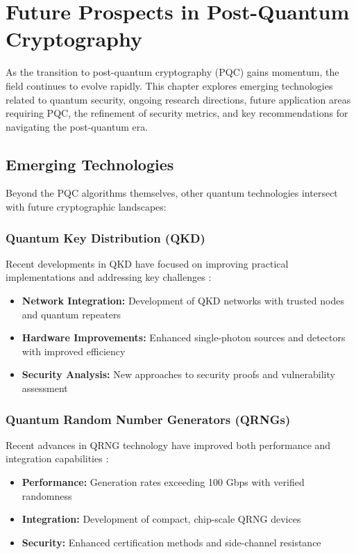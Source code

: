 \chapter{Future Prospects in Post-Quantum Cryptography}\label{chap:future_prospects}

As the transition to post-quantum cryptography (PQC) gains momentum, the field continues to evolve rapidly. This chapter explores emerging technologies related to quantum security, ongoing research directions, future application areas requiring PQC, the refinement of security metrics, and key recommendations for navigating the post-quantum era.

\section{Emerging Technologies}\label{sec:emerging_tech_ch8}

Beyond the PQC algorithms themselves, other quantum technologies intersect with future cryptographic landscapes:

\subsection{Quantum Key Distribution (QKD)}
Recent developments in QKD have focused on improving practical implementations and addressing key challenges \parencite{qkd_advances_2024}:

\begin{itemize}
    \item \textbf{Network Integration:} Development of QKD networks with trusted nodes and quantum repeaters \parencite{qkd_networks_2024}
    \item \textbf{Hardware Improvements:} Enhanced single-photon sources and detectors with improved efficiency \parencite{qkd_hardware_2024}
    \item \textbf{Security Analysis:} New approaches to security proofs and vulnerability assessment \parencite{qkd_security_2024}
\end{itemize}

\subsection{Quantum Random Number Generators (QRNGs)}
Recent advances in QRNG technology have improved both performance and integration capabilities \parencite{qrng_advances_2024}:

\begin{itemize}
    \item \textbf{Performance:} Generation rates exceeding 100 Gbps with verified randomness \parencite{qrng_performance_2024}
    \item \textbf{Integration:} Development of compact, chip-scale QRNG devices \parencite{qrng_integration_2024}
    \item \textbf{Security:} Enhanced certification methods and side-channel resistance \parencite{qrng_security_2024}
\end{itemize}

